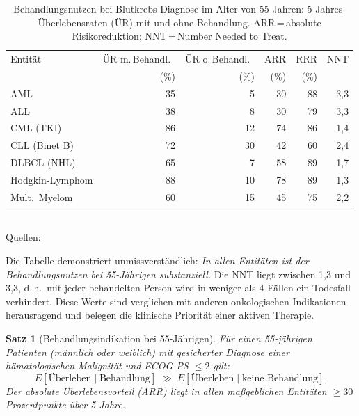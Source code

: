 ﻿\documentclass[12pt,a4paper]{article}
\newtheorem{theorem}{Satz}[section]
\theoremstyle{definition}
\begin{document}
\begin{table}[ht]
\centering
\caption{Behandlungsnutzen bei Blutkrebs-Diagnose im Alter von 55 Jahren:
5-Jahres-Überlebensraten (ÜR) mit und ohne Behandlung.
ARR\,=\,absolute Risikoreduktion; NNT\,=\,Number Needed to Treat.}
\label{tab:benefit55}
\begin{tabular}{@{}lrrrrr@{}}
\toprule
Entität & ÜR m.\,Behandl.\ & ÜR o.\,Behandl.\ & ARR & RRR & NNT \\
        & (\%) & (\%) & (\%) & (\%) & \\
\midrule
AML           & 35   & 5  & 30   & 88  & 3,3  \\
ALL           & 38   & 8  & 30   & 79  & 3,3  \\
CML (TKI)     & 86   & 12 & 74   & 86  & 1,4  \\
CLL (Binet B) & 72   & 30 & 42   & 60  & 2,4  \\
DLBCL (NHL)   & 65   & 7  & 58   & 89  & 1,7  \\
Hodgkin-Lymphom   & 88   & 10 & 78   & 89  & 1,3  \\
Mult.\ Myelom & 60   & 15 & 45   & 75  & 2,2  \\
\bottomrule
\end{tabular}
\smallskip\\
\footnotesize Quellen: \cite{dohner2017,kantarjian2021,hochhaus2017,zenz2014,coiffier2002,kumar2017,siegel2023,burnett2007,appelbaum2006}
\end{table}

Die Tabelle demonstriert unmissverständlich: \emph{In allen Entitäten ist der
Behandlungsnutzen bei 55-Jährigen substanziell.} Die NNT liegt zwischen 1,3 und 3,3,
d.\,h.\ mit jeder behandelten Person wird in weniger als 4 Fällen ein Todesfall
verhindert. Diese Werte sind verglichen mit anderen onkologischen Indikationen
herausragend und belegen die klinische Priorität einer aktiven Therapie.

\begin{theorem}[Behandlungsindikation bei 55-Jährigen]
  \label{thm:indikation}
  Für einen 55-jährigen Patienten (männlich oder weiblich) mit gesicherter Diagnose
  einer hämatologischen Malignität und ECOG-PS $\leq 2$ gilt:
  \begin{equation}
    E\left[\text{Überleben} \mid \text{Behandlung}\right]
    \;\gg\;
    E\left[\text{Überleben} \mid \text{keine Behandlung}\right].
    \label{eq:survival_benefit}
  \end{equation}
  Der absolute Überlebensvorteil (ARR) liegt in allen maßgeblichen Entitäten
  $\geq 30$ Prozentpunkte über 5 Jahre.
\end{theorem}
\end{document}
